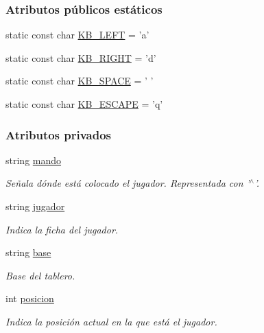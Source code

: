\subsubsection*{Atributos públicos estáticos}
\begin{DoxyCompactItemize}
\item 
static const char \hyperlink{classMando_a61277e93015f5d44d37416f1475be542}{K\-B\-\_\-\-L\-E\-F\-T} = 'a'
\item 
static const char \hyperlink{classMando_a75b32aa31a64931f62c5737b8f09bf39}{K\-B\-\_\-\-R\-I\-G\-H\-T} = 'd'
\item 
static const char \hyperlink{classMando_ade68606cf2abf043c08e281d1531c78a}{K\-B\-\_\-\-S\-P\-A\-C\-E} = ' '
\item 
static const char \hyperlink{classMando_a3c4e7465d5b25fcaf8f3b50b444421a3}{K\-B\-\_\-\-E\-S\-C\-A\-P\-E} = 'q'
\end{DoxyCompactItemize}
\subsubsection*{Atributos privados}
\begin{DoxyCompactItemize}
\item 
string \hyperlink{classMando_a156e71bce6ea523dccbce03021bee4dd}{mando}
\begin{DoxyCompactList}\small\item\em Señala dónde está colocado el jugador. Representada con '$^\wedge$'. \end{DoxyCompactList}\item 
string \hyperlink{classMando_ab4791c4f5bb306c1bbcf95047e010163}{jugador}
\begin{DoxyCompactList}\small\item\em Indica la ficha del jugador. \end{DoxyCompactList}\item 
string \hyperlink{classMando_ad914a93d7fb6c085a26d5d70bbb7fecd}{base}
\begin{DoxyCompactList}\small\item\em Base del tablero. \end{DoxyCompactList}\item 
int \hyperlink{classMando_a7971a6eaa8b936977be7460ffa28530f}{posicion}
\begin{DoxyCompactList}\small\item\em Indica la posición actual en la que está el jugador. \end{DoxyCompactList}\end{DoxyCompactItemize}


